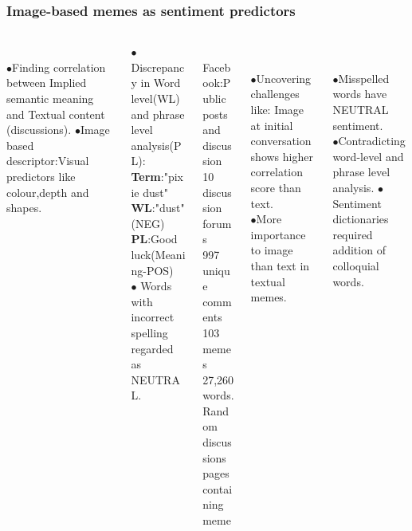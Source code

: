 \documentclass[]{beamer}
\begin{document}
\begin{frame}\frametitle{Image-based memes as sentiment predictors\cite{imageSentimentPred}}
\begin{columns}
	\begin{column}{0.20\textwidth}
		{}\\
		$\bullet$Finding correlation between Implied semantic meaning and Textual content (discussions).
		$\bullet$Image based descriptor:Visual predictors like colour,depth and shapes.
	\end{column}
	\begin{column}{0.23\textwidth}
		{}
		\begin{center}$\bullet$Discrepancy in Word level(WL) and phrase level analysis(PL):
		\textbf{Term}:"pixie dust"\\
		\textbf{WL}:"dust"(NEG)\\
		\textbf{PL}:Good luck(Meaning-POS)\\
		$\bullet$ Words with incorrect spelling regarded as NEUTRAL.
	\end{center} 
	\end{column}
\begin{column}{0.20\textwidth}
	{}\\
	Facebook:Public posts and discussion\\
	10 discussion forums\\
	997 unique comments
	103 memes
	27,260 words.\\Random discussions pages containing meme
\end{column}
\begin{column}{0.20\textwidth}
	{}\\
	\begin{center}$\bullet$Uncovering challenges like:
	Image at initial conversation shows higher correlation score than text.\\
	$\bullet$More importance to image than text in textual memes.
\end{center}
\end{column}
\begin{column}{0.20\textwidth}
	{}\\
	\begin{center}
	$\bullet$Misspelled words have NEUTRAL sentiment.\\
	$\bullet$Contradicting word-level and phrase level analysis.
	$\bullet$Sentiment dictionaries required addition of colloquial words.
	\end{center}
\end{column}

\end{columns}
\end{frame}
\end{document}
